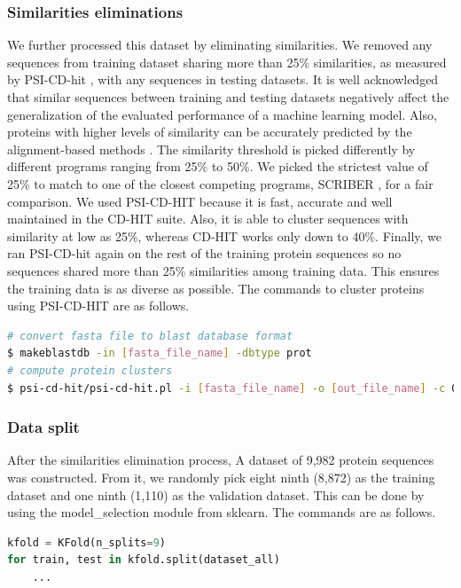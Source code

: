 \subsubsection{Similarities eliminations}
We further processed this dataset by eliminating similarities. We removed any sequences from training dataset sharing more than 25\% similarities, as measured by PSI-CD-hit \cite{li2006cd,fu2012cd}, with any sequences in testing datasets. It is well acknowledged that similar sequences between training and testing datasets negatively affect the generalization of the evaluated performance of a machine learning model. Also, proteins with higher levels of similarity can be accurately predicted by the alignment-based methods \cite{zhang2018review}. The similarity threshold is picked differently by different programs ranging from 25\% to 50\%. We picked the strictest value of 25\% to match to one of the closest competing programs, SCRIBER \cite{zhang2019scriber}, for a fair comparison. We used PSI-CD-HIT because it is fast, accurate and well maintained in the CD-HIT suite. Also, it is able to cluster sequences with similarity at low as 25\%, whereas CD-HIT works only down to 40\%. Finally, we ran PSI-CD-hit again on the rest of the training protein sequences so no sequences shared more than 25\% similarities among training data. This ensures the training data is as diverse as possible. The commands to cluster proteins using PSI-CD-HIT are as follows.
\begin{lstlisting}[language=bash,frame=single]
# convert fasta file to blast database format
$ makeblastdb -in [fasta_file_name] -dbtype prot
# compute protein clusters
$ psi-cd-hit/psi-cd-hit.pl -i [fasta_file_name] -o [out_file_name] -c 0.25
\end{lstlisting}
\subsubsection{Data split}
After the similarities elimination process, A dataset of 9,982 protein sequences was constructed. From it, we randomly pick eight ninth (8,872) as the training dataset and one ninth (1,110) as the validation dataset. This can be done by using the model\_selection module from sklearn. The commands are as follows.
\begin{lstlisting}[language=python,frame=single]
kfold = KFold(n_splits=9)
for train, test in kfold.split(dataset_all)
    ...
\end{lstlisting}


